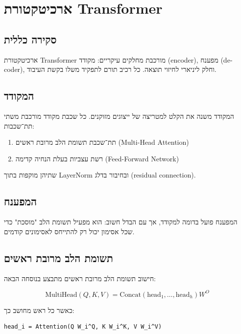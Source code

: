 \chapter{ארכיטקטורת \textenglish{Transformer}}

\section{סקירה כללית}

ארכיטקטורת \textenglish{Transformer} מורכבת מחלקים עיקריים:
מקודד (\textenglish{encoder}), מפענח (\textenglish{decoder}), וחלק ליניארי לחיזוי תוצאה.
כל רכיב תורם לתפקיד משלו בקשת העיבוד.

\section{המקודד}

המקודד משנה את הקלט למטריצה של ייצוגים מזוקנים.
כל שכבת מקודד מורכבת משתי תת־שכבות:

\begin{enumerate}
\item תת־שכבת תשומת הלב מרובת ראשים (\textenglish{Multi-Head Attention})
\item רשת עצביות בעלת הנחיה קדימה (\textenglish{Feed-Forward Network})
\end{enumerate}

שתיהן מוקפות בתוך \textenglish{LayerNorm} ובחיבור בדלג (\textenglish{residual connection}).

\section{המפענח}

המפענח פועל בדומה למקודד, אך עם הבדל חשוב:
הוא מפעיל תשומת הלב "מוסכת" כדי שכל אסימון יכול רק להתייחס לאסימונים קודמים.

\section{תשומת הלב מרובת ראשים}

חישוב תשומת הלב מרובת ראשים מתבצע בנוסחה הבאה:

\begin{equation}
\text{MultiHead}(Q, K, V) = \text{Concat}(\text{head}_1, \ldots, \text{head}_h) W^O
\end{equation}

כאשר כל ראש מחושב כך:

\begin{LTR}
\begin{verbatim}
head_i = Attention(Q W_i^Q, K W_i^K, V W_i^V)
\end{verbatim}
\end{LTR}

